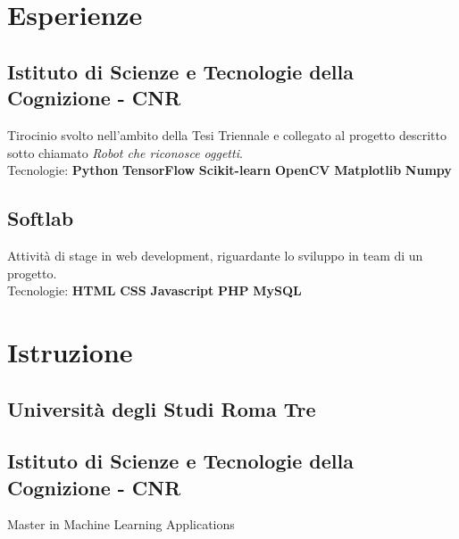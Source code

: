 \documentclass[]{deedy-resume-openfont}
\begin{document}
\hfill
\begin{minipage}[t]{0.66\textwidth} 


\section{Esperienze}
\subsection{Istituto di Scienze e Tecnologie della Cognizione - CNR}
Tirocinio svolto nell'ambito della Tesi Triennale e collegato al progetto descritto sotto chiamato \textit{Robot che riconosce oggetti}. \\
Tecnologie: \textbf{Python} \textbullet{} \textbf{TensorFlow} \textbullet{} \textbf{Scikit-learn} \textbullet{} \textbf{OpenCV} \textbullet{} \textbf{Matplotlib} \textbullet{} \textbf{Numpy}
\sectionsep

\subsection{Softlab}
Attività di stage in web development, riguardante lo sviluppo in team di un progetto. \\
Tecnologie: \textbf{HTML} \textbullet{} \textbf{CSS} \textbullet{} \textbf{Javascript} \textbullet{} \textbf{PHP} \textbullet{} \textbf{MySQL}
\sectionsep


\section{Istruzione} 

\subsection{Università degli Studi Roma Tre}
\sectionsep

\subsection{Istituto di Scienze e Tecnologie della Cognizione - CNR}
Master in Machine Learning Applications \\
\sectionsep


\end{minipage}
\end{document}
